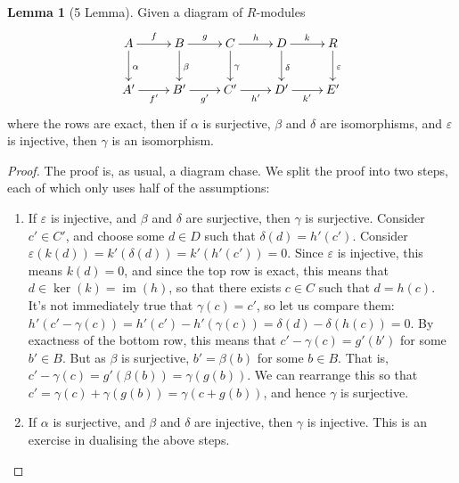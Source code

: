 \documentclass{tufte-handout}
\DeclareMathOperator{\im}{im}
\theoremstyle{definition}
\newtheorem{lemma}{Lemma}
\begin{document}
\begin{lemma}[5 Lemma]
Given a diagram of $R$-modules
\[
	\xymatrix{
	A\ar[r]^f \ar[d]^\alpha & B \ar[r]^g \ar[d]^\beta & C \ar[r]^h \ar[d]^\gamma & D \ar[r]^k \ar[d]^\delta & R \ar[d]^\varepsilon \\
	A' \ar[r]_{f'} & B' \ar[r]_{g'} & C' \ar[r]_{h'} & D' \ar[r]_{k'} & E'
	}
\]
where the rows are exact, then if $\alpha$ is surjective, $\beta$ and $\delta$ are isomorphisms, and $\varepsilon$ is injective, then $\gamma$ is an isomorphism.
\end{lemma}

\begin{proof}
The proof is, as usual, a diagram chase. We split the proof into two steps, each of which only uses half
of the assumptions:
\begin{enumerate}

\item If $\varepsilon$ is injective, and $\beta$ and $\delta$ are surjective, then $\gamma$ is 
surjective. Consider $c' \in C'$, and choose some $d\in D$ such that $\delta(d) = h'(c')$. 
Consider $\varepsilon(k(d)) = k'(\delta(d)) = k'(h'(c')) = 0$. Since $\varepsilon$ is injective, 
this means $k(d)=0$, and since the top row is exact, this means that $d\in \ker(k) = \im(h)$, so 
that there exists $c\in C$ such that $d=h(c)$. It's not immediately true that $\gamma(c) = c'$, 
so let us compare them: $h'(c'-\gamma(c)) = h'(c') - h'(\gamma(c)) = \delta(d) - \delta(h(c)) = 
0$. By exactness of the bottom row, this means that $c' - \gamma(c) = g'(b')$ for some $b'\in 
B$. But as $\beta$ is surjective, $b' = \beta(b)$ for some $b\in B$. That is, $c' - \gamma(c) = 
g'(\beta(b)) = \gamma(g(b))$. We can rearrange this so that $c' = \gamma(c) + \gamma(g(b)) = \gamma(c+g(b))$, and hence $\gamma$ is surjective.

\item If $\alpha$ is surjective, and $\beta$ and $\delta$ are injective, then $\gamma$ is injective. This is an exercise in dualising the above steps.\qedhere
\end{enumerate}
\end{proof}
\end{document}
